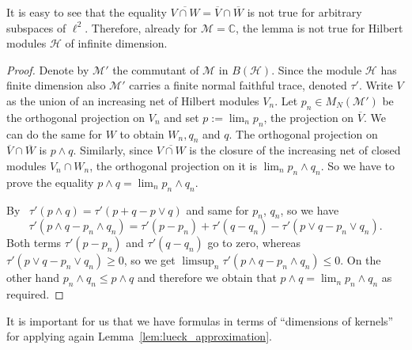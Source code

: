 \documentclass[AHL,Unicode,longabstracts,published]{cedram}
\newcommand{\Cmath}{\mathbb{C}}
\newcommand{\cM}{\mathcal{M}}
\newcommand{\cH}{\mathcal{H}}
\begin{document}
\begin{rema}
It is easy to see that the equality $\overline{V \cap W} = \overline{V} \cap \overline{W}$ is not true for arbitrary subspaces of $\ell^2$. Therefore, already for $\cM=\Cmath$, the lemma is not true for Hilbert modules $\cH$ of infinite dimension.
\end{rema}
\begin{proof}
Denote by $\cM'$ the commutant of $\cM$ in $B(\cH)$. Since the module $\cH$ has finite dimension also $\cM'$ carries a finite normal faithful trace, denoted $\tau'$. Write $V$ as the union of an increasing net of Hilbert modules $V_n$. Let $p_n \in M_N(\cM')$ be the orthogonal projection on $V_n$ and set $p:=\lim_n p_n$, the projection on $\overline{V}$. We can do the same for $W$ to obtain $W_n,q_n$ and $q$. The orthogonal projection on $\overline{V} \cap \overline{W}$ is $ p\wedge q$. Similarly, since $\overline{V \cap W}$ is the closure of the increasing net of closed modules $V_n \cap W_n$, the orthogonal projection on it is $\lim_n p_n \wedge q_n$. So we have to prove the equality $p \wedge q = \lim_n p_n \wedge q_n$.

By~\cite[Proposition~V.1.6]{takesakiVol1} $\tau'(p \wedge q) = \tau'(p+q-p\vee q)$ and same for $p_n$, $q_n$, so we have
\[
\tau'\left(p \wedge q - p_n \wedge q_n\right) = \tau'(p-p_n) +\tau'(q-q_n) - \tau'\left(p \vee q - p_n \vee q_n\right).
\]
Both terms $\tau'(p-p_n)$ and $\tau'(q-q_n)$ go to zero, whereas $\tau'(p \vee q - p_n \vee q_n) \geq 0$, so we get $\limsup_n \tau'(p \wedge q - p_n \wedge q_n)\leq 0$. On the other hand $p_n \wedge q_n \leq p \wedge q$ and therefore we obtain that $p \wedge q =\lim_n p_n \wedge q_n$ as required.
\end{proof}

It is important for us that we have formulas in terms of ``dimensions of kernels'' for applying again Lemma~\ref{lem:lueck_approximation}.
\end{document}
